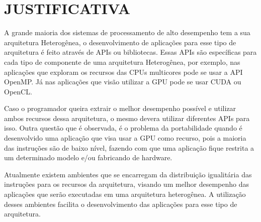 
\chapter{JUSTIFICATIVA}
\label{chap:justificativa}

A grande maioria dos sistemas de processamento de alto desempenho tem a sua arquitetura Heterogênea, o desenvolvimento de aplicações para esse tipo de arquitetura é feito através de APIs ou bibliotecas. Essas APIs são específicas para cada tipo de componente de uma arquitetura Heterogênea, por exemplo, nas aplicações que exploram os recursos das CPUs multicores pode se usar a API OpenMP. Já nas aplicações que visão utilizar a GPU pode se usar CUDA ou OpenCL.

Caso o programador queira extrair o melhor desempenho possível e utilizar ambos recursos dessa arquitetura, o mesmo devera utilizar diferentes APIs para isso. Outra questão que é observada, é o problema da portabilidade quando é desenvolvido uma aplicação que visa usar a GPU como recurso, pois a maioria das instruções são de baixo nível, fazendo com que uma aplicação fique restrita a um determinado modelo e/ou fabricando de hardware.

Atualmente existem ambientes que se encarregam da distribuição igualitária das instruções para os recursos da arquitetura, visando um melhor desempenho das aplicações que serão executadas em uma arquitetura heterogênea. A utilização desses ambientes facilita o desenvolvimento das aplicações para esse tipo de arquitetura.